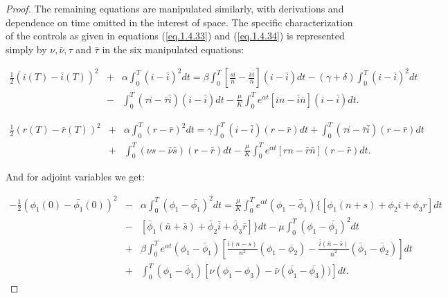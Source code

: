 \begin{proof}
The remaining equations are manipulated similarly, with derivations and dependence on time omitted in the interest of space. The specific characterization of the controls as given in equations (\ref{eq.1.4.33}) and (\ref{eq.1.4.34}) is represented simply by $\nu,\bar{\nu},\tau$ and $\bar{\tau}$ in the six manipulated equations:

\begin{eqnarray}
\frac{1}{2}(i(T)-\bar{i}(T))^2&+&\alpha\int_{0}^{T}(i-\bar{i})^2dt=\beta\int_{0}^{T}\left[\frac{si}{n}-\frac{\bar{s}\bar{i}}{\bar{n}}\right](i-\bar{i})dt-(\gamma+\delta)\int_{0}^{T}(i-\bar{i})^2dt\nonumber\\
&-&\int_{0}^{T}(\tau i-\bar{\tau}\bar{i})(i-\bar{i})dt-\frac{\mu}{K}\int_{0}^{T} e^{\alpha t}\left[in-\bar{i}\bar{n}\right](i-\bar{i})dt. \label{eq.1.4.36}
\end{eqnarray}

\begin{eqnarray}
\frac{1}{2}(r(T)-\bar{r}(T))^2&+&\alpha\int_{0}^{T}(r-\bar{r})^2dt=\gamma\int_{0}^{T}(i-\bar{i})(r-\bar{r})dt+\int_{0}^{T}(\tau i-\bar{\tau}\bar{i})(r-\bar{r})dt\nonumber\\
&+&\int_{0}^{T}(\nu s-\bar{\nu}\bar{s})(r-\bar{r})dt-\frac{\mu}{K}\int_{0}^{T} e^{\alpha t}\left[rn-\bar{r}\bar{n}\right](r-\bar{r})dt. \label{eq.1.4.37}
\end{eqnarray}

And for adjoint variables we get:

\begin{eqnarray}
-\frac{1}{2}(\phi_1(0)-\bar{\phi_1}(0))^2&-&\alpha\int_{0}^{T}(\phi_1-\bar{\phi_1})^2dt=\frac{\mu}{K}\int_{0}^{T}e^{\alpha t}(\phi_1-\bar{\phi}_1)\{[\phi_1(n+s)+\phi_2 i +\phi_3 r]dt\nonumber\\
&-&[\bar{\phi}_1(\bar{n}+\bar{s})+\bar{\phi}_2 \bar{i} +\bar{\phi}_3 \bar{r}]\}dt-\mu\int_{0}^{T}(\phi_1-\bar{\phi_1})^2dt \nonumber\\
&+&\beta\int_{0}^{T}e^{\alpha t}(\phi_1-\bar{\phi}_1)\left[\frac{i(n-s)}{n^2}(\phi_1-\phi_2)-\frac{\bar{i}(\bar{n}-\bar{s})}{\bar{n}^2}(\bar{\phi}_1-\bar{\phi}_2)\right]dt \nonumber\\
&+&\int_{0}^{T} (\phi_1-\bar{\phi}_1)[\nu(\phi_1-\phi_3)-\bar{\nu}(\bar{\phi_1}-\bar{\phi_3}))]dt. \label{eq.1.4.38}
\end{eqnarray}


\end{proof}
